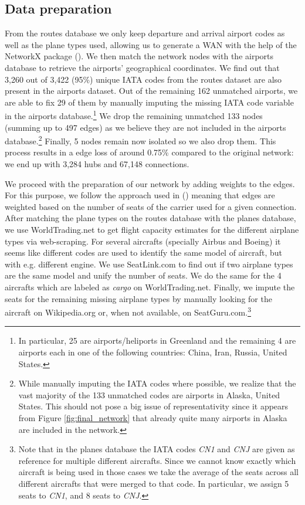 \documentclass{Template_resources/netsci-project}
\begin{document}

\subsection{Data preparation}
From the routes database we only keep departure and arrival airport codes as well as the plane types used, allowing us to generate a WAN with the help of the NetworkX package (\cite{networkx}). We then match the network nodes with the airports database to retrieve the airports' geographical coordinates. We find out that 3,260 out of 3,422 (95\%) unique IATA codes from the routes dataset are also present in the airports dataset. Out of the remaining 162 unmatched airports, we are able to fix 29 of them by manually imputing the missing IATA code variable in the airports database.\footnote{In particular, 25 are airports/heliports in Greenland and the remaining 4 are airports each in one of the following countries: China, Iran, Russia, United States.} We drop the remaining unmatched 133 nodes (summing up to 497 edges) as we believe they are not included in the airports database.\footnote{While manually imputing the IATA codes where possible, we realize that the vast majority of the 133 unmatched codes are airports in Alaska, United States. This should not pose a big issue of representativity since it appears from Figure \ref{fig:final_network} that already quite many airports in Alaska are included in the network.} Finally, 5 nodes remain now isolated so we also drop them. This process results in a edge loss of around 0.75\% compared to the original network: we end up with 3,284 hubs and 67,148 connections.

We proceed with the preparation of our network by adding weights to the edges. For this purpose, we follow the approach used in \citeauthor{Lawyer2016} (\citeyear{Lawyer2016}) meaning that edges are weighted based on the number of seats of the carrier used for a given connection. After matching the plane types on the routes database with the planes database, we use WorldTrading.net to get flight capacity estimates for the different airplane types via web-scraping. For several aircrafts (specially Airbus and Boeing) it seems like different codes are used to identify the same model of aircraft, but with e.g. different engine. We use SeatLink.com to find out if two airplane types are the same model and unify the number of seats. We do the same for the 4 aircrafts which are labeled as \textit{cargo} on WorldTrading.net. Finally, we impute the seats for the remaining missing airplane types by manually looking for the aircraft on Wikipedia.org or, when not available, on SeatGuru.com.\footnote{Note that in the planes database the IATA codes \textit{CN1} and \textit{CNJ} are given as reference for multiple different aircrafts. Since we cannot know exactly which aircraft is being used in those cases we take the average of the seats across all different aircrafts that were merged to that code. In particular, we assign 5 seats to \textit{CN1}, and 8 seats to \textit{CNJ}.}
\end{document}
